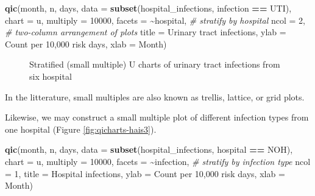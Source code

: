\documentclass[
]{book}
\makeatletter
\newenvironment{Shaded}{\begin{snugshade}}{\end{snugshade}}
\newcommand{\AttributeTok}[1]{\textcolor[rgb]{0.13,0.29,0.53}{#1}}
\newcommand{\CommentTok}[1]{\textcolor[rgb]{0.56,0.35,0.01}{\textit{#1}}}
\newcommand{\DecValTok}[1]{\textcolor[rgb]{0.00,0.00,0.81}{#1}}
\newcommand{\FunctionTok}[1]{\textcolor[rgb]{0.13,0.29,0.53}{\textbf{#1}}}
\newcommand{\NormalTok}[1]{#1}
\newcommand{\SpecialCharTok}[1]{\textcolor[rgb]{0.81,0.36,0.00}{\textbf{#1}}}
\newcommand{\StringTok}[1]{\textcolor[rgb]{0.31,0.60,0.02}{#1}}
\newcommand*\pandocbounded[1]{%
  \sbox\pandoc@box{#1}%
  \Gscale@div\@tempa{\textheight}{\dimexpr\ht\pandoc@box+\dp\pandoc@box\relax}%
  \Gscale@div\@tempb{\linewidth}{\wd\pandoc@box}%
  \ifdim\@tempb\p@<\@tempa\p@\let\@tempa\@tempb\fi%
  \ifdim\@tempa\p@<\p@\scalebox{\@tempa}{\usebox\pandoc@box}%
  \else\usebox{\pandoc@box}%
  \fi%
}
\makeatother
\begin{document}
\begin{Shaded}
\begin{Highlighting}[]
\FunctionTok{qic}\NormalTok{(month, n, days, }
    \AttributeTok{data     =} \FunctionTok{subset}\NormalTok{(hospital\_infections, }
\NormalTok{                      infection }\SpecialCharTok{==} \StringTok{\textquotesingle{}UTI\textquotesingle{}}\NormalTok{),}
    \AttributeTok{chart    =} \StringTok{\textquotesingle{}u\textquotesingle{}}\NormalTok{,}
    \AttributeTok{multiply =} \DecValTok{10000}\NormalTok{,}
    \AttributeTok{facets   =} \SpecialCharTok{\textasciitilde{}}\NormalTok{hospital,                     }\CommentTok{\# stratify by hospital}
    \AttributeTok{ncol     =} \DecValTok{2}\NormalTok{,                             }\CommentTok{\# two{-}column arrangement of plots}
    \AttributeTok{title    =} \StringTok{\textquotesingle{}Urinary tract infections\textquotesingle{}}\NormalTok{,}
    \AttributeTok{ylab     =} \StringTok{\textquotesingle{}Count per 10,000 risk days\textquotesingle{}}\NormalTok{,}
    \AttributeTok{xlab     =} \StringTok{\textquotesingle{}Month\textquotesingle{}}\NormalTok{)}
\end{Highlighting}
\end{Shaded}

\begin{figure}
\centering
\pandocbounded{}
\caption{\label{fig:qicharts-hais2}Stratified (small multiple) U charts of urinary tract infections from six hospital}
\end{figure}

In the litterature, small multiples are also known as trellis, lattice, or grid plots.

Likewise, we may construct a small multiple plot of different infection types from one hospital (Figure \ref{fig:qicharts-hais3}).

\begin{Shaded}
\begin{Highlighting}[]
\FunctionTok{qic}\NormalTok{(month, n, days, }
    \AttributeTok{data     =} \FunctionTok{subset}\NormalTok{(hospital\_infections, }
\NormalTok{                      hospital }\SpecialCharTok{==} \StringTok{\textquotesingle{}NOH\textquotesingle{}}\NormalTok{),}
    \AttributeTok{chart    =} \StringTok{\textquotesingle{}u\textquotesingle{}}\NormalTok{,}
    \AttributeTok{multiply =} \DecValTok{10000}\NormalTok{,}
    \AttributeTok{facets   =} \SpecialCharTok{\textasciitilde{}}\NormalTok{infection,                   }\CommentTok{\# stratify by infection type}
    \AttributeTok{ncol     =} \DecValTok{1}\NormalTok{,}
    \AttributeTok{title    =} \StringTok{\textquotesingle{}Hospital infections\textquotesingle{}}\NormalTok{,}
    \AttributeTok{ylab     =} \StringTok{\textquotesingle{}Count per 10,000 risk days\textquotesingle{}}\NormalTok{,}
    \AttributeTok{xlab     =} \StringTok{\textquotesingle{}Month\textquotesingle{}}\NormalTok{)}
\end{Highlighting}
\end{Shaded}
\end{document}
